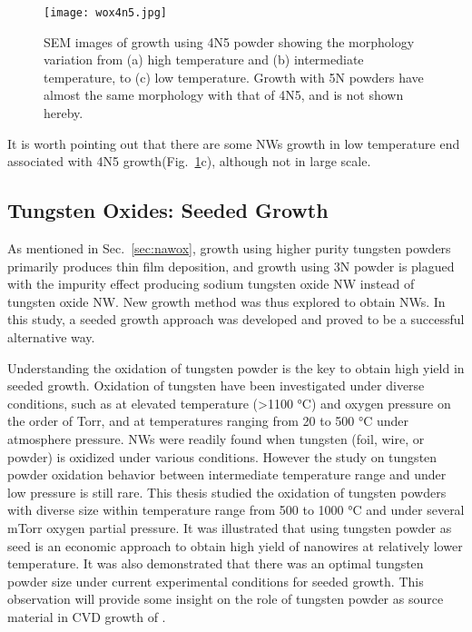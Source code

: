 \begin{figure}[htb]
\centering
\texttt{[image: wox4n5.jpg]}
\caption[SEM images of  growth using 4N5 powder]{SEM images of  growth using 4N5 powder showing the morphology variation from (a) high temperature and (b) intermediate temperature, to (c) low temperature. Growth with 5N powders have almost the same morphology with that of 4N5, and is not shown hereby.}
\label{fig:wox4n5}
\end{figure}
It is worth pointing out that there are some NWs growth in low temperature end associated with 4N5 growth(Fig.~\ref{fig:wox4n5}c), although not in large scale.

\subsection{Tungsten Oxides: Seeded Growth}\label{sec:sgfg}

As mentioned in Sec.~\ref{sec:nawox}, growth using higher purity tungsten powders primarily produces thin film deposition, and growth using 3N powder is plagued with the impurity effect producing sodium tungsten oxide NW instead of tungsten oxide NW. New growth method was thus explored to obtain  NWs. In this study, a seeded growth approach was developed and proved to be a successful alternative way. 

Understanding the oxidation of tungsten powder is the key to obtain high yield in seeded growth. Oxidation of tungsten have been investigated under diverse conditions, such as at elevated temperature (\textgreater 1100 \si{\degreeCelsius}) and oxygen pressure on the order of Torr,\cite{Gulbransen1960} and at temperatures ranging from 20 to 500 \si{\degreeCelsius} under atmosphere pressure.\cite{Warren1996}  NWs were readily found when tungsten (foil, wire, or powder) is oxidized under various conditions.\cite{Zhu1999,Karuppanan2007,Hsieh2010} However the study on tungsten powder oxidation behavior between intermediate temperature range and under low pressure is still rare. This thesis studied the oxidation of tungsten powders with diverse size within temperature range from 500 to 1000 \si{\degreeCelsius} and under several mTorr oxygen partial pressure. It was illustrated that using tungsten powder as seed is an economic approach to obtain high yield of  nanowires at relatively lower temperature. It was also demonstrated that there was an optimal tungsten powder size under current experimental conditions for seeded growth. This observation will provide some insight on the role of tungsten powder as source material in CVD growth of .

